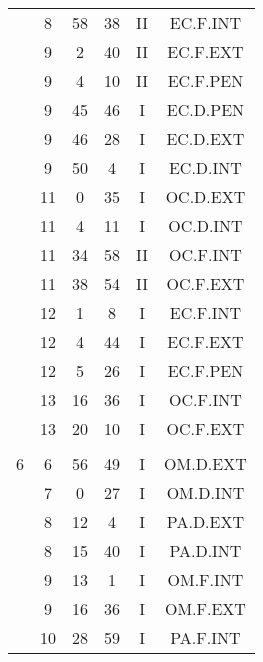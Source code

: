 \documentclass[12pt, a4paper]{article}
\begin{document}
\begin{multicols}{3}
{\begin{tabular}{c c c c c c}
	 	 	 	 & 8 & 58 & 38 & II & EC.F.INT\\%
	 	 	 	 & 9 & 2 & 40 & II & EC.F.EXT\\%
	 	 	 	 & 9 & 4 & 10 & II & EC.F.PEN\\%
	 	 	 	 & 9 & 45 & 46 & I & EC.D.PEN\\%
	 	 	 	 & 9 & 46 & 28 & I & EC.D.EXT\\%
	 	 	 	 & 9 & 50 & 4 & I & EC.D.INT\\%
	 	 	 	 & 11 & 0 & 35 & I & OC.D.EXT\\%
	 	 	 	 & 11 & 4 & 11 & I & OC.D.INT\\%
	 	 	 	 & 11 & 34 & 58 & II & OC.F.INT\\%
	 	 	 	 & 11 & 38 & 54 & II & OC.F.EXT\\%
	 	 	 	 & 12 & 1 & 8 & I & EC.F.INT\\%
	 	 	 	 & 12 & 4 & 44 & I & EC.F.EXT\\%
	 	 	 	 & 12 & 5 & 26 & I & EC.F.PEN\\%
	 	 	 	 & 13 & 16 & 36 & I & OC.F.INT\\%
	 	 	 	 & 13 & 20 & 10 & I & OC.F.EXT\\%
	 	 	 	 & & & & & \\%
	 	 	 	6 & 6 & 56 & 49 & I & OM.D.EXT\\%
	 	 	 	 & 7 & 0 & 27 & I & OM.D.INT\\%
	 	 	 	 & 8 & 12 & 4 & I & PA.D.EXT\\%
	 	 	 	 & 8 & 15 & 40 & I & PA.D.INT\\%
	 	 	 	 & 9 & 13 & 1 & I & OM.F.INT\\%
	 	 	 	 & 9 & 16 & 36 & I & OM.F.EXT\\%
	 	 	 	 & 10 & 28 & 59 & I & PA.F.INT\\%

\end{tabular}}
\end{multicols}
\end{document}
